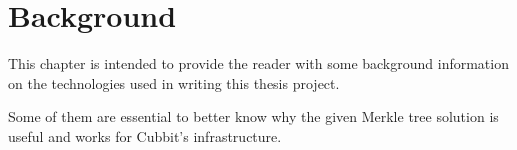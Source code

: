 \chapter{Background}

This chapter is intended to provide the reader with some background information on the technologies used in writing this thesis project.

Some of them are essential to better know why the given Merkle tree solution is useful and works for Cubbit's infrastructure.




